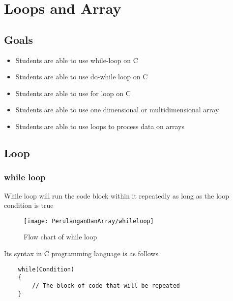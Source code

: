 \chapter{Loops and Array}
\section{Goals}
\begin{itemize}
    \item Students are able to use while-loop on C
    \item Students are able to use do-while loop on C
    \item Students are able to use for loop on C
    \item Students are able to use one dimensional or multidimensional array
    \item Students are able to use loops to process data on arrays
\end{itemize}
\section{Loop}
\subsection{while loop}
While loop will run the code block within it repeatedly as long as the loop condition is true


\begin{figure}[H]
		\centering
		\texttt{[image: PerulanganDanArray/whileloop]}
		\caption{Flow chart of while loop}
		\label{fig:whileloop}
\end{figure}

Its syntax in C programming language is as follows
\begin{verbatim}
    while(Condition)
    {
        // The block of code that will be repeated
    }
\end{verbatim}

